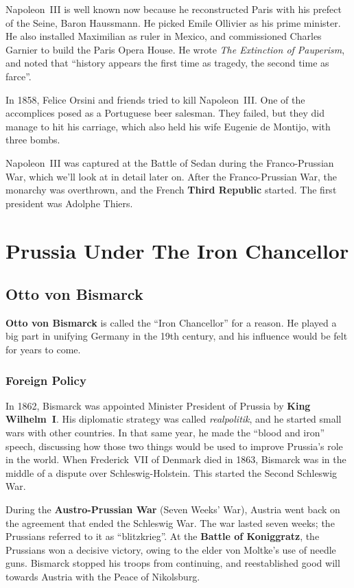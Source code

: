 Napoleon~III is well known now because he reconstructed Paris with his prefect of the Seine, Baron Haussmann.
He picked Emile Ollivier as his prime minister.
He also installed Maximilian as ruler in Mexico, and commissioned Charles Garnier to build the Paris Opera House.
He wrote \textit{The Extinction of Pauperism},
and noted that ``history appears the first time as tragedy, the second time as farce''.

In 1858, Felice Orsini and friends tried to kill Napoleon~III\@.
One of the accomplices posed as a Portuguese beer salesman.
They failed, but they did manage to hit his carriage, which also held his wife Eugenie de Montijo, with three bombs.

Napoleon~III was captured at the Battle of Sedan during the Franco-Prussian War,
which we'll look at in detail later on.
After the Franco-Prussian War, the monarchy was overthrown, and the French \textbf{Third Republic} started.
The first president was Adolphe Thiers.


\section{Prussia Under The Iron Chancellor}

\subsection*{Otto von Bismarck}

\textbf{Otto von Bismarck} is called the ``Iron Chancellor'' for a reason.
He played a big part in unifying Germany in the 19th century, and his influence would be felt for years to come.

\subsubsection*{Foreign Policy}

In 1862, Bismarck was appointed Minister President of Prussia by \textbf{King Wilhelm~I}.
His diplomatic strategy was called \textit{realpolitik}, and he started small wars with other countries.
In that same year, he made the ``blood and iron'' speech,
discussing how those two things would be used to improve Prussia's role in the world.
When Frederick~VII of Denmark died in 1863, Bismarck was in the middle of a dispute over Schleswig-Holstein.
This started the Second Schleswig War.

During the \textbf{Austro-Prussian War} (Seven Weeks' War),
Austria went back on the agreement that ended the Schleswig War.
The war lasted seven weeks; the Prussians referred to it as ``blitzkrieg''.
At the \textbf{Battle of Koniggratz}, the Prussians won a decisive victory,
owing to the elder von Moltke's use of needle guns.
Bismarck stopped his troops from continuing,
and reestablished good will towards Austria with the Peace of Nikolsburg.

